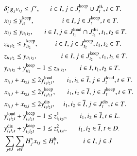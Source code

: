 \documentclass[a4j,11pt,twocolumn]{jsarticle}
\begin{document}
\begin{align}
  &\hspace{1.0em} {\delta_{i}^{\rm{v}}}{g_{j}} {v_{ij}} \leq f^{\rm{v}}, \hspace{1.5em} i \in I, j \in J_{t}^{\rm{keep}} \cup J_{t}^{\rm{lk}}, t \in T. \\
  &\hspace{1.0em} {x_{ij}} \leq {y_{it}^{\rm{keep}}}, \hspace{4.11em} i \in I, j \in J_{t}^{\rm{keep}}, t \in T. \\
  &\hspace{1.0em} {x_{ij}} \leq {y_{it_1t_2}}, \hspace{1.61em} i \in I, j \in J_{t_1}^{\rm{load}} \cap J_{t_2}^{\rm{dis}}, {t_1},{t_2} \in T. \\
  &\hspace{1.0em} {z_{it_1t_2}} \leq {y_{it_2}^{\rm{keep}}} ,  \hspace{2.50em} i \in I, j \in J_{t_2}^{\rm{keep}}, t_1,t_2 \in T. \\
  &\hspace{1.0em} {z_{it_1t_2}} \leq {y_{it_1t_2}} ,  \hspace{3.49em} i \in I, j \in J_{t_2}^{\rm{keep}}, t_1,t_2 \in T. \\
&\hspace{1.0em} {y_{it_1t_2}} + y_{it_2}^{\rm{keep}} - 1 \leq {z_{it_1t_2}}, \hspace{1.79em} i \in I, t_1,t_2 \in T. \\
&\hspace{1.0em} {x_{i_1j}} + {x_{i_2j}} \leq 2{y_{i_1i_2t}^{\rm{load}}}, \hspace{1.71em} i_1, i_2 \in \overline{I}, j \in J_{t}^{\rm{load}}, t \in T. \\
&\hspace{1.0em} {x_{i_1j}} + {x_{i_2j}} \leq 2{y_{i_1i_2t}^{\rm{keep}}}, \hspace{1.64em} i_1, i_2 \in \overline{I}, j \in J_{t}^{\rm{keep}}, t \in T. \\
&\hspace{1.0em} {x_{i_1j}} + {x_{i_2j}} \leq 2{y_{i_1i_2t}^{\rm{dis}}}, \hspace{1.19em} i_1, i_2 \in \overline{I}, j \in J_{t}^{\rm{dis}}, t \in T. \\
&\hspace{1.0em} {y_{i_1i_2t}^{\rm{load}}} + y_{i_1i_2t}^{\rm{keep}} - 1 \leq {z_{i_1i_2t}^1}, \hspace{1.77em}  i_1, i_2 \in \overline{I}, t \in L. \\
&\hspace{1.0em} {y_{i_1i_2t}^{\rm{dis}}} + y_{i_1i_2t}^{\rm{keep}} - 1 \leq {z_{i_1i_2t}^2}, \hspace{1.58em}  i_1, i_2 \in \overline{I}, t \in D. \\
&\hspace{1.0em} \sum_{j \in J} \sum_{i \in I} H_j^{\rm{v}} {x_{ij}} \leq H_i^{\rm{h}},  \hspace{3.5em} i \in I, j \in J
\end{align}
\end{document}
